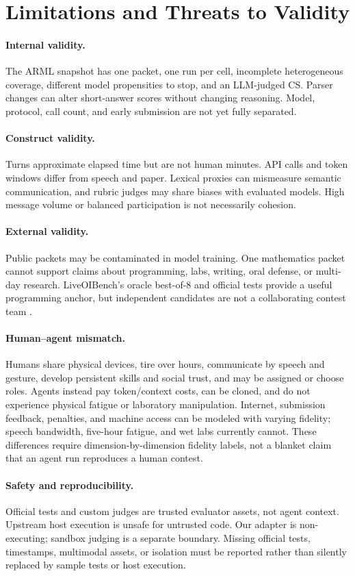 \section{Limitations and Threats to Validity}
\paragraph{Internal validity.}
The ARML snapshot has one packet, one run per cell, incomplete heterogeneous
coverage, different model propensities to stop, and an LLM-judged CS. Parser
changes can alter short-answer scores without changing reasoning. Model,
protocol, call count, and early submission are not yet fully separated.

\paragraph{Construct validity.}
Turns approximate elapsed time but are not human minutes. API calls and token
windows differ from speech and paper. Lexical proxies can mismeasure semantic
communication, and rubric judges may share biases with evaluated models.
High message volume or balanced participation is not necessarily cohesion.

\paragraph{External validity.}
Public packets may be contaminated in model training. One mathematics packet
cannot support claims about programming, labs, writing, oral defense, or
multi-day research. LiveOIBench's oracle best-of-8 and official tests provide a
useful programming anchor, but independent candidates are not a collaborating
contest team \cite{zou2025liveoibench}.

\paragraph{Human--agent mismatch.}
Humans share physical devices, tire over hours, communicate by speech and
gesture, develop persistent skills and social trust, and may be assigned or
choose roles. Agents instead pay token/context costs, can be cloned, and do
not experience physical fatigue or laboratory manipulation. Internet,
submission feedback, penalties, and machine access can be modeled with
varying fidelity; speech bandwidth, five-hour fatigue, and wet labs currently
cannot. These differences require dimension-by-dimension fidelity labels, not
a blanket claim that an agent run reproduces a human contest.

\paragraph{Safety and reproducibility.}
Official tests and custom judges are trusted evaluator assets, not agent
context. Upstream host execution is unsafe for untrusted code. Our adapter is
non-executing; sandbox judging is a separate boundary. Missing official tests,
timestamps, multimodal assets, or isolation must be reported rather than
silently replaced by sample tests or host execution.

